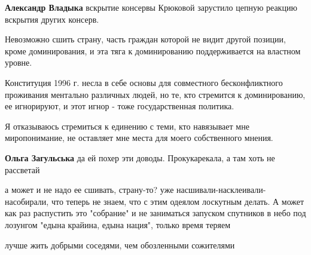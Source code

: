 \begin{itemize}
\begin{itemize}
\textbf{Александр Владыка} вскрытие консервы Крюковой зарустило цепную реакцию вскрытия других консерв.

\end{itemize}

 

Невозможно сшить страну, часть граждан которой не видит другой позиции, кроме
доминирования, и эта тяга к доминированию поддерживается на властном уровне.

Конституция 1996 г. несла в себе основы для совместного бесконфликтного
проживания ментально различных людей, но те, кто стремится к доминированию, ее
игнорируют, и этот игнор - тоже государственная политика. 

Я отказываюсь стремиться к единению с теми, кто навязывает мне миропонимание,
не оставляет мне места для моего собственного мнения.

\begin{itemize}
 
\textbf{Ольга Загульська} да ей похер эти доводы. Прокукарекала, а там хоть не рассветай
\end{itemize}

 

а может и не надо ее сшивать, страну-то? уже насшивали-насклеивали-насобирали,
что теперь не знаем, что с этим одеялом лоскутным делать. А может как раз
распустить это "собрание" и не заниматься запуском спутников в небо под
лозунгом "едына крайина, едына нация", только время теряем

лучше жить добрыми соседями, чем обозленными сожителями

\begin{itemize}
 

\end{itemize}
\end{itemize}
